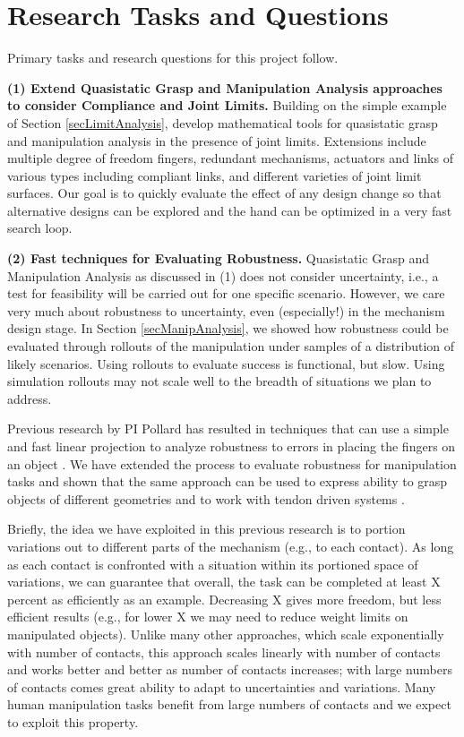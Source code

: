 \section{Research Tasks and Questions}
  \label{secQuestions}

Primary tasks and research questions for this project follow.

\smallskip\noindent
{\bf (1) Extend Quasistatic Grasp and Manipulation Analysis approaches to consider Compliance and Joint Limits.}  Building on the simple example of Section \ref{secLimitAnalysis}, develop mathematical tools for quasistatic grasp and manipulation analysis in the presence of joint limits.  Extensions include multiple degree of freedom fingers, redundant mechanisms, actuators and links of various types including compliant links, and different varieties of joint limit surfaces.   Our goal is to quickly evaluate the effect of any design change so that alternative designs can be explored and the hand can be optimized in a very fast search loop.

\smallskip\noindent
{\bf (2) Fast techniques for Evaluating Robustness.}   Quasistatic Grasp and Manipulation Analysis as discussed in (1) does not consider uncertainty, i.e., a test for feasibility will be carried out for one specific scenario.   However, we care very much about robustness to uncertainty, even (especially!) in the mechanism design stage.  In Section \ref{secManipAnalysis}, we showed how robustness could be evaluated through rollouts of the manipulation under samples of a distribution of likely scenarios.   Using rollouts to evaluate success is functional, but slow.    Using simulation rollouts may not scale well to the breadth of situations we plan to address.

Previous research by PI Pollard has resulted in techniques that can use a simple and fast linear projection to analyze robustness to errors in placing the fingers on an object \cite{pollard2004closure}.   We have extended the process to evaluate robustness for manipulation tasks \cite{Pollard:WAFR02}  and shown that the same approach can be used to express ability to grasp objects of different geometries \cite{pollard20045} and to work with tendon driven systems \cite{Li:graspDB07}.

Briefly, the idea we have exploited in this previous research is to portion variations out to different parts of the mechanism (e.g., to each contact).   As long as each contact is confronted with a situation within its portioned space of variations, we can guarantee that overall, the task can be completed at least X percent as efficiently as an example.   Decreasing X gives more freedom, but less efficient results (e.g., for lower X we may need to reduce weight limits on manipulated objects).   Unlike many other approaches, which scale exponentially with number of contacts, this approach scales linearly with number of contacts and works better and better as number of contacts increases; with large numbers of contacts comes great ability to adapt to uncertainties and variations.   Many human manipulation tasks benefit from large numbers of contacts and we expect to exploit this property.

